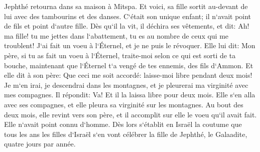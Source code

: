 \verse Jephthé retourna dans sa maison à Mitspa. Et voici, sa fille sortit au-devant de lui avec des tambourins et des danses. C`était son unique enfant; il n`avait point de fils et point d`autre fille. 
\verse Dès qu`il la vit, il déchira ses vêtements, et dit: Ah! ma fille! tu me jettes dans l`abattement, tu es au nombre de ceux qui me troublent! J`ai fait un voeu à l`Éternel, et je ne puis le révoquer. 
\verse Elle lui dit: Mon père, si tu as fait un voeu à l`Éternel, traite-moi selon ce qui est sorti de ta bouche, maintenant que l`Éternel t`a vengé de tes ennemis, des fils d`Ammon. 
\verse Et elle dit à son père: Que ceci me soit accordé: laisse-moi libre pendant deux mois! Je m`en irai, je descendrai dans les montagnes, et je pleurerai ma virginité avec mes compagnes. 
\verse Il répondit: Va! Et il la laissa libre pour deux mois. Elle s`en alla avec ses compagnes, et elle pleura sa virginité sur les montagnes. 
\verse Au bout des deux mois, elle revint vers son père, et il accomplit sur elle le voeu qu`il avait fait. Elle n`avait point connu d`homme. Dès lors s`établit en Israël la coutume 
\verse que tous les ans les filles d`Israël s`en vont célébrer la fille de Jephthé, le Galaadite, quatre jours par année. 

\chapter{}


